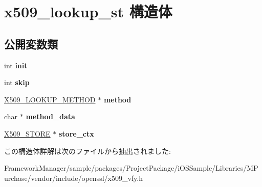 \hypertarget{structx509__lookup__st}{}\section{x509\+\_\+lookup\+\_\+st 構造体}
\label{structx509__lookup__st}
\subsection*{公開変数類}
\begin{DoxyCompactItemize}
\item 
\hypertarget{structx509__lookup__st_a63b25b8fcf160eac9348b88e48eab9c1}{}int {\bfseries init}\label{structx509__lookup__st_a63b25b8fcf160eac9348b88e48eab9c1}

\item 
\hypertarget{structx509__lookup__st_a8d1184cdc9e7f7c4d081a32df8b78a97}{}int {\bfseries skip}\label{structx509__lookup__st_a8d1184cdc9e7f7c4d081a32df8b78a97}

\item 
\hypertarget{structx509__lookup__st_a84bf6103b3374899e01401931ee30eda}{}\hyperlink{structx509__lookup__method__st}{X509\+\_\+\+L\+O\+O\+K\+U\+P\+\_\+\+M\+E\+T\+H\+O\+D} $\ast$ {\bfseries method}\label{structx509__lookup__st_a84bf6103b3374899e01401931ee30eda}

\item 
\hypertarget{structx509__lookup__st_a63bfeed761e0dd16a8fe59d6a3933cb4}{}char $\ast$ {\bfseries method\+\_\+data}\label{structx509__lookup__st_a63bfeed761e0dd16a8fe59d6a3933cb4}

\item 
\hypertarget{structx509__lookup__st_a91fff2cdf32522eb0b037bdb9cdf2e53}{}\hyperlink{structx509__store__st}{X509\+\_\+\+S\+T\+O\+R\+E} $\ast$ {\bfseries store\+\_\+ctx}\label{structx509__lookup__st_a91fff2cdf32522eb0b037bdb9cdf2e53}

\end{DoxyCompactItemize}


この構造体詳解は次のファイルから抽出されました\+:\begin{DoxyCompactItemize}
\item 
Framework\+Manager/sample/packages/\+Project\+Package/i\+O\+S\+Sample/\+Libraries/\+M\+Purchase/vendor/include/openssl/x509\+\_\+vfy.\+h\end{DoxyCompactItemize}
